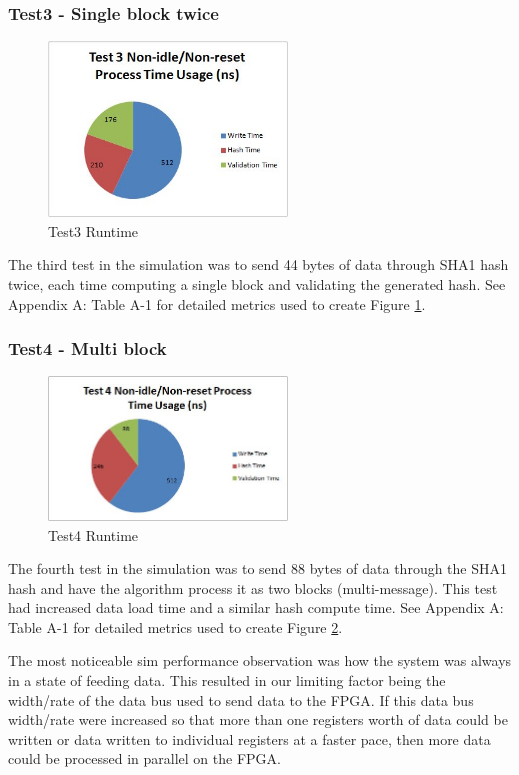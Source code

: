 \documentclass[journal]{IEEEtran}
\begin{document}
\subsubsection{Test3 - Single block twice}
\begin{figure}[ht]
\centering
\includegraphics[width=2.5in]{Test3.jpg}
\caption{Test3 Runtime}
\label{fig_test3Runtime}
\end{figure}
The third test in the simulation was to send 44 bytes of data through SHA1 hash twice, each time computing a single block and validating the generated hash.  See Appendix A: Table A-1 for detailed metrics used to create Figure \ref{fig_test3Runtime}. 
\subsubsection{Test4 - Multi block}
\begin{figure}[ht]
\centering
\includegraphics[width=2.5in]{Test4.jpg}
\caption{Test4 Runtime}
\label{fig_test4Runtime}
\end{figure} 
The fourth test in the simulation was to send 88 bytes of data through the SHA1 hash and have the algorithm process it as two blocks (multi-message).  This test had increased data load time and a similar hash compute time.  See Appendix A: Table A-1 for detailed metrics used to create Figure \ref{fig_test4Runtime}.

The most noticeable sim performance observation was how the system was always in a state of feeding data.  This resulted in our limiting factor being the width/rate of the data bus used to send data to the FPGA.  If this data bus width/rate were increased so that more than one registers worth of data could be written or data written to individual registers at a faster pace, then more data could be processed in parallel on the FPGA.  
\end{document}
